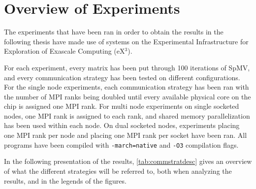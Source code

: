 \section{Overview of Experiments}
The experiments that have been ran in order to obtain the results in the following thesis have made use of systems on the Experimental Infrastructure for Exploration of Exascale Computing (eX\(^{3}\)).
\medskip

For each experiment, every matrix has been put through 100 iterations of SpMV, and every communication strategy has been tested on different configurations. For the single node experiments, each communication strategy has been ran with the number of MPI ranks being doubled until every available physical core on the chip is assigned one MPI rank. For multi node experiments on single socketed nodes, one MPI rank is assigned to each rank, and shared memory parallelization has been used within each node. On dual socketed nodes, experiments placing one MPI rank per node and placing one MPI rank per socket have been ran. All programs have been compiled with \texttt{-march=native} and \texttt{-O3} compilation flags.


In the following presentation of the results, \ref{tab:commstratdesc} gives an overview of what the different strategies will be referred to, both when analyzing the results, and in the legends of the figures.

